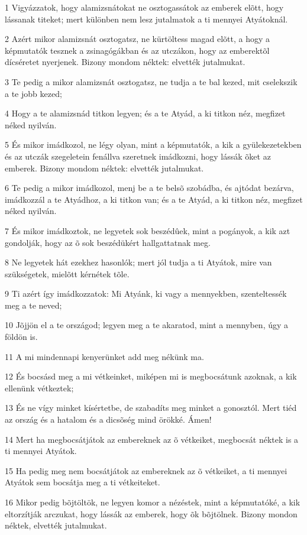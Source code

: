 \par 1 Vigyázzatok, hogy alamizsnátokat ne osztogassátok az emberek elõtt, hogy lássanak titeket; mert különben nem lesz jutalmatok a ti mennyei Atyátoknál.
\par 2 Azért mikor alamizsnát osztogatsz, ne kürtöltess magad elõtt, a hogy a képmutatók tesznek a zsinagógákban és az utczákon, hogy az emberektõl dícséretet nyerjenek. Bizony mondom néktek: elvették jutalmukat.
\par 3 Te pedig a mikor alamizsnát osztogatsz, ne tudja a te bal kezed, mit cselekszik a te jobb kezed;
\par 4 Hogy a te alamizsnád titkon legyen; és a te Atyád, a ki titkon néz, megfizet néked nyilván.
\par 5 És mikor imádkozol, ne légy olyan, mint a képmutatók, a kik a gyülekezetekben és az utczák szegeletein fenállva szeretnek imádkozni, hogy lássák õket az emberek. Bizony mondom néktek: elvették jutalmukat.
\par 6 Te pedig a mikor imádkozol, menj be a te belsõ szobádba, és ajtódat bezárva, imádkozzál a te Atyádhoz, a ki titkon van; és a te Atyád, a ki titkon néz, megfizet néked nyilván.
\par 7 És mikor imádkoztok, ne legyetek sok beszédûek, mint a pogányok, a kik azt gondolják, hogy az õ sok beszédükért hallgattatnak meg.
\par 8 Ne legyetek hát ezekhez hasonlók; mert jól tudja a ti Atyátok, mire van szükségetek, mielõtt kérnétek tõle.
\par 9 Ti azért így imádkozzatok: Mi Atyánk, ki vagy a mennyekben, szenteltessék meg a te neved;
\par 10 Jõjjön el a te országod; legyen meg a te akaratod, mint a mennyben, úgy a földön is.
\par 11 A mi mindennapi kenyerünket add meg nékünk ma.
\par 12 És bocsásd meg a mi vétkeinket, miképen mi is megbocsátunk azoknak, a kik ellenünk vétkeztek;
\par 13 És ne vígy minket kísértetbe, de szabadíts meg minket a gonosztól. Mert tiéd az ország és a hatalom és a dicsõség mind örökké. Ámen!
\par 14 Mert ha megbocsátjátok az embereknek az õ vétkeiket, megbocsát néktek is a ti mennyei Atyátok.
\par 15 Ha pedig meg nem bocsátjátok az embereknek az õ vétkeiket, a ti mennyei Atyátok sem bocsátja meg a ti vétkeiteket.
\par 16 Mikor pedig bõjtöltök, ne legyen komor a nézéstek, mint a képmutatóké, a kik eltorzítják arczukat, hogy lássák az emberek, hogy õk bõjtölnek. Bizony mondon néktek, elvették jutalmukat.
